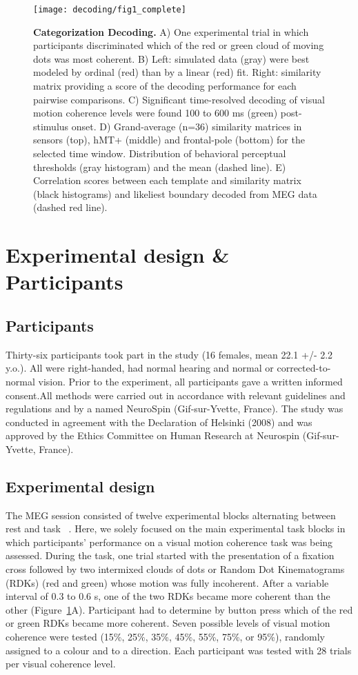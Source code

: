 \begin{figure}
\centering
	\texttt{[image: decoding/fig1\_complete]}
    \caption{{\bf Categorization Decoding.} A) One experimental trial in which participants discriminated  which of the red or green cloud of moving dots was most coherent. B) Left: simulated data (gray) were best modeled by ordinal (red) than by a linear (red) fit. Right: similarity matrix providing a score of the decoding performance for each pairwise comparisons. C) Significant time-resolved decoding of visual motion coherence levels were found 100 to 600 ms (green) post-stimulus onset. D) Grand-average (n=36) similarity matrices in sensors (top), hMT+ (middle) and frontal-pole (bottom) for the selected time window. Distribution of behavioral perceptual thresholds (gray histogram) and the mean (dashed line). E) Correlation scores between each template and similarity matrix (black histograms) and likeliest boundary decoded from MEG data (dashed red line).}\label{fig:fig1}
\end{figure}


\section{Experimental design \& Participants}
\subsection*{Participants}
Thirty-six participants took part in the study (16 females, mean 22.1 +/- 2.2 y.o.). All were right-handed, had normal hearing and normal or corrected-to-normal vision. Prior to the experiment, all participants gave a written informed consent.All methods were carried out in accordance with relevant guidelines and regulations and by a named NeuroSpin (Gif-sur-Yvette, France). The study was conducted in agreement with the Declaration of Helsinki (2008) and was approved by the Ethics Committee on Human Research at Neurospin (Gif-sur-Yvette, France). 

\subsection*{Experimental design}
The MEG session consisted of twelve experimental blocks alternating between rest and task ~\cite{23zilber2014supramodal}. Here, we solely focused on the main experimental task blocks in which participants' performance on a visual motion coherence task was being assessed. During the task, one trial started with the presentation of a fixation cross followed by two intermixed clouds of dots or Random Dot Kinematograms (RDKs) (red and green) whose motion was fully incoherent. After a variable interval of 0.3 to 0.6 s, one of the two RDKs became more coherent than the other (Figure~\ref{fig:fig1}A). Participant had to determine by button press which of the red or green RDKs became more coherent. Seven possible levels of visual motion coherence were tested (15\%, 25\%, 35\%, 45\%, 55\%, 75\%, or 95\%), randomly assigned to a colour and to a direction. Each participant was tested with 28 trials per visual coherence level.

